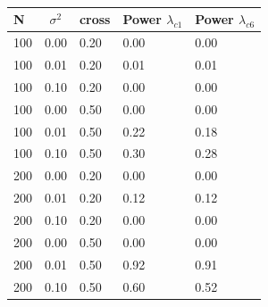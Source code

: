 \documentclass[
  man,floatsintext]{apa6}
\begin{document}
\clearpage



\begin{appendix}
\section{}
\begin{table}[H]

\begin{center}
\begin{threeparttable}

\caption{\label{tab:unnamed-chunk-6}}

\begin{tabular}{lllll}
\toprule
N & \multicolumn{1}{c}{$\sigma^2$} & \multicolumn{1}{c}{cross} & \multicolumn{1}{c}{Power $\lambda_{c1}$} & \multicolumn{1}{c}{Power $\lambda_{c6}$}\\
\midrule
100 & 0.00 & 0.20 & 0.00 & 0.00\\
100 & 0.01 & 0.20 & 0.01 & 0.01\\
100 & 0.10 & 0.20 & 0.00 & 0.00\\
100 & 0.00 & 0.50 & 0.00 & 0.00\\
100 & 0.01 & 0.50 & 0.22 & 0.18\\
100 & 0.10 & 0.50 & 0.30 & 0.28\\
200 & 0.00 & 0.20 & 0.00 & 0.00\\
200 & 0.01 & 0.20 & 0.12 & 0.12\\
200 & 0.10 & 0.20 & 0.00 & 0.00\\
200 & 0.00 & 0.50 & 0.00 & 0.00\\
200 & 0.01 & 0.50 & 0.92 & 0.91\\
200 & 0.10 & 0.50 & 0.60 & 0.52\\
\bottomrule
\end{tabular}

\end{threeparttable}
\end{center}

\end{table}
\end{appendix}
\end{document}
